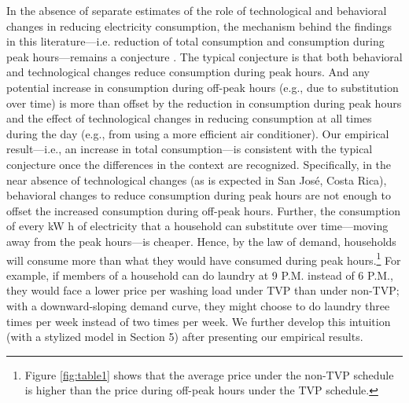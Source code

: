 \documentclass[12pt]{article}
\begin{document}
\sloppy In the absence of separate estimates of the role of technological and behavioral changes in reducing electricity consumption, the mechanism behind the findings in this literature---i.e.  reduction of total consumption and consumption during peak hours---remains a conjecture \citep{allcottRethinkingRealtimeElectricity2011,jessoeUnderstandingRolePrice2014}. The typical conjecture is that both behavioral and technological changes reduce consumption during peak hours. And any potential increase in consumption during off-peak hours (e.g., due to substitution over time) is more than offset by the reduction in consumption during peak hours and the effect of technological changes in reducing consumption at all times during the day (e.g., from using a more efficient air conditioner). Our empirical result---i.e., an increase in total consumption---is consistent with the typical conjecture once the differences in the context are recognized. Specifically, in the near absence of technological changes (as is expected in San José, Costa Rica), behavioral changes to reduce consumption during peak hours are not enough to offset the increased consumption during off-peak hours. Further, the consumption of every kW h of electricity that a household can substitute over time---moving away from the peak hours---is cheaper. Hence, by the law of demand, households will consume more than what they would have consumed during peak hours.\footnote{Figure \ref{fig:table1} shows that the average price under the non-TVP schedule is higher than the price during off-peak hours under the TVP schedule.} For example, if members of a household can do laundry at 9 P.M. instead of 6 P.M., they would face a lower price per washing load under TVP than under non-TVP; with a downward-sloping demand curve, they might choose to do laundry three times per week instead of two times per week. We further develop this intuition (with a stylized model in Section 5) after presenting our empirical results.
\end{document}
